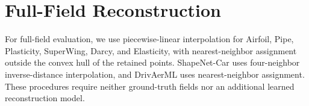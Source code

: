 \section{Full-Field Reconstruction}
\label{app:full_field_reconstruction}

For full-field evaluation, we use piecewise-linear interpolation for Airfoil,
Pipe, Plasticity, SuperWing, Darcy, and Elasticity, with nearest-neighbor
assignment outside the convex hull of the retained points. ShapeNet-Car
uses four-neighbor inverse-distance interpolation, and DrivAerML uses
nearest-neighbor assignment. These procedures require neither ground-truth
fields nor an additional learned reconstruction model.
